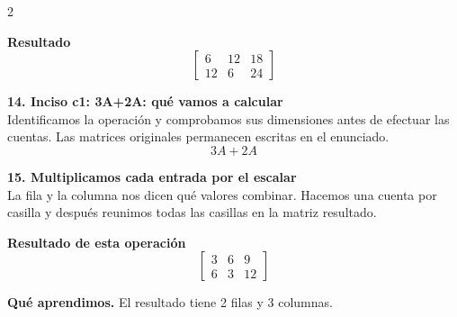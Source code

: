 \documentclass[11pt,a4paper,landscape]{article}
\begin{document}
\begin{multicols*}{2}
\begin{minipage}{\linewidth}
\par\smallskip \textbf{Resultado}\[\begin{bmatrix}6 & 12 & 18\\12 & 6 & 24\end{bmatrix}\]
\end{minipage}\par\medskip
\noindent\begin{minipage}{\linewidth}\textbf{14. Inciso c1: 3A+2A: qué vamos a calcular}\\[2pt]Identificamos la operación y comprobamos sus dimensiones antes de efectuar las cuentas. Las matrices originales permanecen escritas en el enunciado.
\[3A+2A\]
\end{minipage}\par\medskip
\noindent\begin{minipage}{\linewidth}\textbf{15. Multiplicamos cada entrada por el escalar}\\[2pt]La fila y la columna nos dicen qué valores combinar. Hacemos una cuenta por casilla y después reunimos todas las casillas en la matriz resultado.
\par{}\par\smallskip
\par\smallskip \textbf{Resultado de esta operación}\[\begin{bmatrix}3 & 6 & 9\\6 & 3 & 12\end{bmatrix}\]
\par\smallskip\textbf{Qué aprendimos.} El resultado tiene 2 filas y 3 columnas.
\end{minipage}\par\medskip

\end{multicols*}
\end{document}
